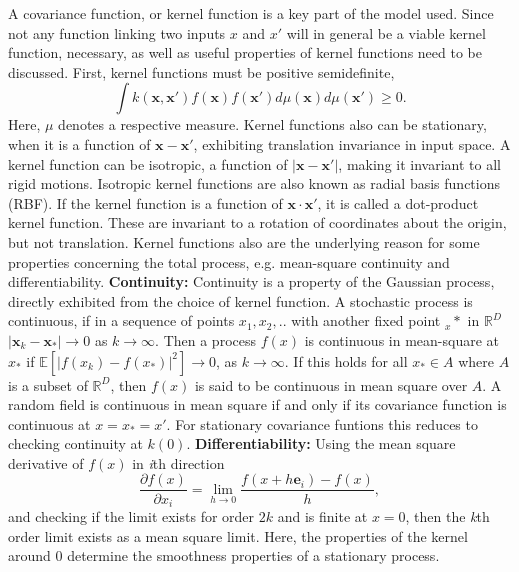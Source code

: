A covariance function, or kernel function is a key part of the model used. Since not any function linking two inputs $x$ and $x'$ will in general be a viable kernel function, necessary, as well as useful properties of kernel functions need to be discussed. First, kernel functions must be positive semidefinite, 
\begin{equation}%
	\int k(\bm{x},\bm{x'})f(\bm{x})f(\bm{x'})d\mu(\bm{x})d\mu(\bm{x'}) \geq 0.
\label{eq:positive_semidefiniteness_of_kernel_functions}
\end{equation}
Here, $\mu$ denotes a respective measure. Kernel functions also can be stationary, when it is a function of $\bm{x} - \bm{x'}$, exhibiting translation invariance in input space. A kernel function can be isotropic, a function of $|\bm{x} - \bm{x'}|$, making it invariant to all rigid motions. Isotropic kernel functions are also known as radial basis functions (RBF). If the kernel function is a function of $\bm{x} \cdot \bm{x'}$, it is called a dot-product kernel function. These are invariant to a rotation of coordinates about the origin, but not translation. Kernel functions also are the underlying reason for some properties concerning the total process, e.g. mean-square continuity and differentiability. \newline
\textbf{Continuity:} Continuity is a property of the Gaussian process, directly exhibited from the choice of kernel function. A stochastic process is continuous, if in a sequence of points $x_1, x_2, ..$ with another fixed point $_x*$ in $\mathbb{R}^D$ $|\bm{x}_k - \bm{x}_*| \to 0$ as $k \to \infty$. Then a process $f(x)$ is continuous in mean-square at $x_*$ if $\mathbb{E}[|f(x_k)-f(x_*)|^2] \to 0$, as $k \to \infty$. If this holds for all $x_* \in A$ where $A$ is a subset of $\mathbb{R}^D$, then $f(x)$ is said to be continuous in mean square over $A$. A random field is continuous in mean square if and only if its covariance function is continuous at $x=x_*=x'$. 
For stationary covariance funtions this reduces to checking continuity at $k(0)$. \newline
\textbf{Differentiability:} Using the mean square derivative of $f(x)$ in \textit{i}th direction 
\begin{equation}%
	\frac{\partial f(x)}{\partial x_i} = \lim_{h \to 0} \frac{f(x+h\bm{e}_i)-f(x)}{h},
\label{eq:mean_square_derivative_of_i-th_direction}
\end{equation}
and checking if the limit exists for order $2k$ and is finite at $x=0$, then the \textit{k}th order limit exists as a mean square limit. Here, the properties of the kernel around $0$ determine the smoothness properties of a stationary process. \newline \newline
